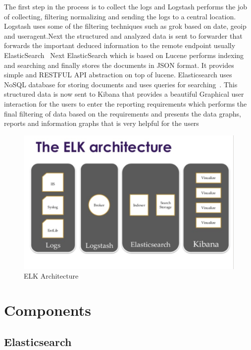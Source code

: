 The first step in the process is to collect the logs and Logstash performs the 
job of collecting, filtering normalizing and sending the logs to a central 
location. Logstash uses some of the filtering techniques such as grok based on 
date, geoip and useragent.Next the structured and analyzed data is sent to 
forwarder that forwards the important deduced information to the remote endpoint
 usually ElasticSearch~\cite{hid-sp18-410-elk-architecture}
 Next ElasticSearch which is based on Lucene performs indexing and searching and
  finally stores the documents in JSON format. It provides simple and RESTFUL 
  API abstraction on top of lucene. Elasticsearch uses NoSQL database for 
  storing documents and uses queries for searching~\cite{hid-sp18-410-elk-
architecture}.
This structured data is now sent to Kibana that provides a beautiful Graphical 
user interaction for the users to enter the reporting requirements which 
performs the final filtering of data based on the requirements and presents 
the data graphs, reports and information graphs that is very helpful for the 
users~\cite{hid-sp18-410-elk-architecture}

\begin{figure}[!ht]
  \centering\includegraphics[width=\columnwidth]{image/ELK-Architecture.PNG}
  \caption{ELK Architecture~\cite{hid-sp18-410-elk-architecture-image}}
\label{f:architecture}
\end{figure}


\section{Components}


\subsection{Elasticsearch}

